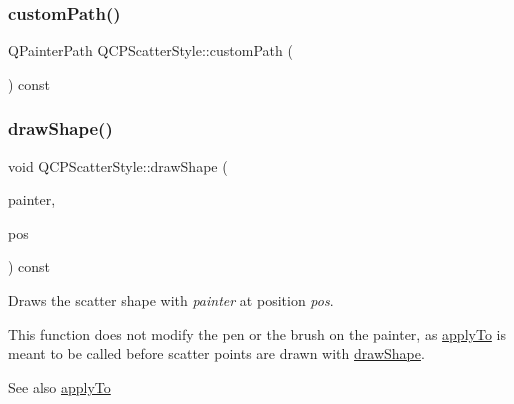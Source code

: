 \mbox{\label{class_q_c_p_scatter_style_aef1fac84c9830fd97f2a8568e605e372}} 
\subsubsection{\texorpdfstring{customPath()}{customPath()}}
{\footnotesize\ttfamily Q\+Painter\+Path Q\+C\+P\+Scatter\+Style\+::custom\+Path (\begin{DoxyParamCaption}{ }\end{DoxyParamCaption}) const\hspace{0.3cm}{\ttfamily [inline]}}

\mbox{\label{class_q_c_p_scatter_style_a89b5105e6027bfcbfeefed9d201b607c}} 
\subsubsection{\texorpdfstring{drawShape()}{drawShape()}\hspace{0.1cm}{\footnotesize\ttfamily [1/2]}}
{\footnotesize\ttfamily void Q\+C\+P\+Scatter\+Style\+::draw\+Shape (\begin{DoxyParamCaption}\item[{\mbox{\hyperlink{class_q_c_p_painter}{Q\+C\+P\+Painter}} $\ast$}]{painter,  }\item[{const Q\+PointF \&}]{pos }\end{DoxyParamCaption}) const}

Draws the scatter shape with {\itshape painter} at position {\itshape pos}.

This function does not modify the pen or the brush on the painter, as \mbox{\hyperlink{class_q_c_p_scatter_style_afd8044ece445300499ca0dc164821e0f}{apply\+To}} is meant to be called before scatter points are drawn with \mbox{\hyperlink{class_q_c_p_scatter_style_a89b5105e6027bfcbfeefed9d201b607c}{draw\+Shape}}.

\begin{DoxySeeAlso}{See also}
\mbox{\hyperlink{class_q_c_p_scatter_style_afd8044ece445300499ca0dc164821e0f}{apply\+To}} 
\end{DoxySeeAlso}
\mbox{\label{class_q_c_p_scatter_style_a95c297b114c77c22428ef40f54620ddf}} 
